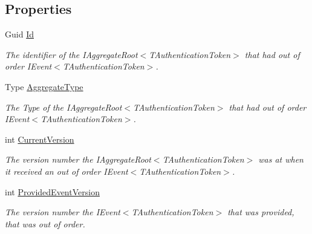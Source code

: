 \subsection*{Properties}
\begin{DoxyCompactItemize}
\item 
Guid \hyperlink{classCqrs_1_1Domain_1_1Exceptions_1_1EventsOutOfOrderException_a24813f4ef04e2da6e2170addd3252731_a24813f4ef04e2da6e2170addd3252731}{Id}
\begin{DoxyCompactList}\small\item\em The identifier of the I\+Aggregate\+Root$<$\+T\+Authentication\+Token$>$ that had out of order I\+Event$<$\+T\+Authentication\+Token$>$. \end{DoxyCompactList}\item 
Type \hyperlink{classCqrs_1_1Domain_1_1Exceptions_1_1EventsOutOfOrderException_a2c6ac371e78b4d2cd22c218bf914293a_a2c6ac371e78b4d2cd22c218bf914293a}{Aggregate\+Type}
\begin{DoxyCompactList}\small\item\em The Type of the I\+Aggregate\+Root$<$\+T\+Authentication\+Token$>$ that had out of order I\+Event$<$\+T\+Authentication\+Token$>$. \end{DoxyCompactList}\item 
int \hyperlink{classCqrs_1_1Domain_1_1Exceptions_1_1EventsOutOfOrderException_a895c217d8e87f0589bffe1c7c27c4c69_a895c217d8e87f0589bffe1c7c27c4c69}{Current\+Version}
\begin{DoxyCompactList}\small\item\em The version number the I\+Aggregate\+Root$<$\+T\+Authentication\+Token$>$ was at when it received an out of order I\+Event$<$\+T\+Authentication\+Token$>$. \end{DoxyCompactList}\item 
int \hyperlink{classCqrs_1_1Domain_1_1Exceptions_1_1EventsOutOfOrderException_a3f526965db5d3ab81f18d001b2ba4034_a3f526965db5d3ab81f18d001b2ba4034}{Provided\+Event\+Version}
\begin{DoxyCompactList}\small\item\em The version number the I\+Event$<$\+T\+Authentication\+Token$>$ that was provided, that was out of order. \end{DoxyCompactList}\end{DoxyCompactItemize}


